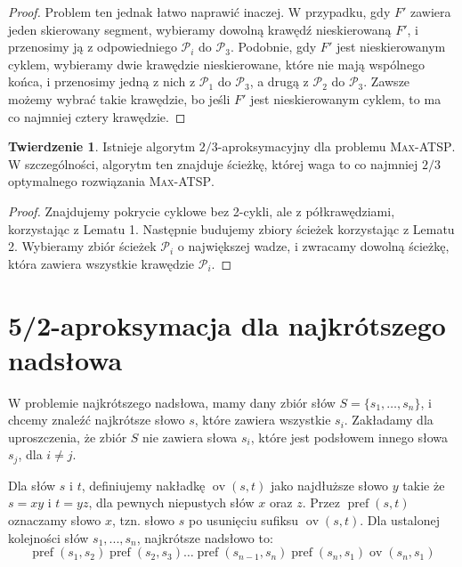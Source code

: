 \documentclass[a4paper,12pt]{article}
\DeclareMathOperator\ov{ov}
\DeclareMathOperator\pref{pref}
\theoremstyle{definition}
\newtheorem{theorem}{Twierdzenie}
\begin{document}
\begin{proof}
  Problem ten jednak łatwo naprawić inaczej. W przypadku, gdy $F'$ zawiera jeden skierowany segment, wybieramy dowolną krawędź nieskierowaną $F'$, i przenosimy ją z odpowiedniego $\mathcal{P}_i$ do $\mathcal{P}_3$. Podobnie, gdy $F'$ jest nieskierowanym cyklem, wybieramy dwie krawędzie nieskierowane, które nie mają wspólnego końca, i przenosimy jedną z nich z $\mathcal{P}_1$ do $\mathcal{P}_3$, a drugą z $\mathcal{P}_2$ do $\mathcal{P}_3$. Zawsze możemy wybrać takie krawędzie, bo jeśli $F'$ jest nieskierowanym cyklem, to ma co najmniej cztery krawędzie.
\end{proof}

\begin{theorem}
  Istnieje algorytm $2/3$-aproksymacyjny dla problemu \textsc{Max-ATSP}. W szczególności, algorytm ten znajduje ścieżkę, której waga to co najmniej $2/3$ optymalnego rozwiązania \textsc{Max-ATSP}.
\end{theorem}

\begin{proof}
  Znajdujemy pokrycie cyklowe bez 2-cykli, ale z półkrawędziami, korzystając z Lematu 1. Następnie budujemy zbiory ścieżek korzystając z Lematu 2. Wybieramy zbiór ścieżek $\mathcal{P}_i$ o największej wadze, i zwracamy dowolną ścieżkę, która zawiera wszystkie krawędzie $\mathcal{P}_i$.
\end{proof}

\section{5/2-aproksymacja dla najkrótszego nadsłowa}

W problemie najkrótszego nadsłowa, mamy dany zbiór słów $S = \{s_1, \ldots, s_n\}$, i chcemy znaleźć najkrótsze słowo $s$, które zawiera wszystkie $s_i$. Zakładamy dla uproszczenia, że zbiór $S$ nie zawiera słowa $s_i$, które jest podsłowem innego słowa $s_j$, dla $i \neq j$.

Dla słów $s$ i $t$, definiujemy nakładkę $\ov(s, t)$ jako najdłuższe słowo $y$ takie że $s = xy$ i $t = yz$, dla pewnych niepustych słów $x$ oraz $z$. Przez $\pref(s, t)$ oznaczamy słowo $x$, tzn. słowo $s$ po usunięciu sufiksu $\ov(s, t)$. Dla ustalonej kolejności słów $s_1, ..., s_n$, najkrótsze nadsłowo to:
\begin{equation*}
	\pref(s_1, s_2)\pref(s_2, s_3)\ldots\pref(s_{n-1}, s_n)\pref(s_n, s_1)\ov(s_n, s_1)
\end{equation*}
\end{document}
